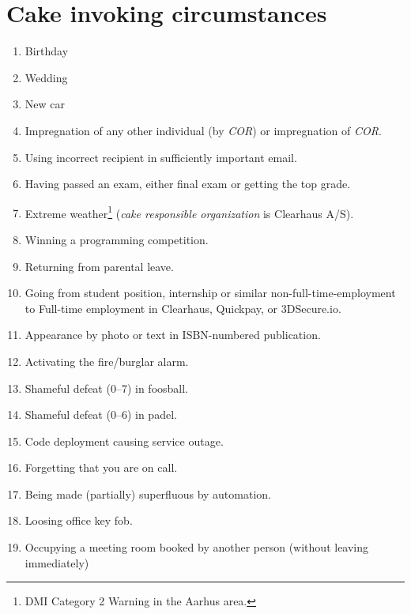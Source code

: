 \documentclass[a4paper, oneside, article]{memoir}
\newcounter{tbc}
\begin{document}
\chapter{Cake invoking circumstances}\label{chp:circumstances}
\begin{enumerate}[§ 1]
  \setcounter{enumi}{\value{tbc}}

  \item Birthday
  \item Wedding
  \item New car
  \item Impregnation of any other individual (by \emph{COR}) or impregnation of
    \emph{COR}.
  \item Using incorrect recipient in sufficiently important email.
  \item Having passed an exam, either final exam or getting the top grade.
  \item Extreme weather\footnote{DMI Category 2 Warning in the Aarhus area.} (\emph{cake responsible organization} is Clearhaus A/S).
  \item Winning a programming competition.
  \item Returning from parental leave.
  \item Going from student position, internship or similar non-full-time-employment to Full-time employment in Clearhaus, Quickpay, or 3DSecure.io.
  \item Appearance by photo or text in ISBN-numbered publication.
  \item Activating the fire/burglar alarm.
  \item Shameful defeat (0--7) in foosball.
  \item Shameful defeat (0--6) in padel.
  \item Code deployment causing service outage.
  \item Forgetting that you are on call.
  \item Being made (partially) superfluous by automation.
  \item Loosing office key fob.
  \item Occupying a meeting room booked by another person (without leaving immediately)
\end{enumerate}
\end{document}
